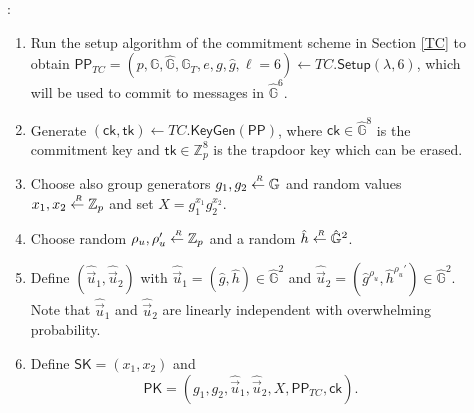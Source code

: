 \documentclass[10pt]{llncs}
\newcommand{\G}{\mathbb{G}}
\newcommand{\Z}{\mathbb{Z}}
\newcommand{\SK}{\mathsf{SK}}
\newcommand{\PK}{\mathsf{PK}}
\newcommand{\ck}{\mathsf{ck}}
\newcommand{\tk}{\mathsf{tk}}
\newcommand{\sample}{\stackrel{{\scriptscriptstyle \mkern4mu R}}{\gets}}
\newcommand{\Setup}{{\mathsf{Setup}}}
\newcommand{\KeyGen}{{\mathsf{KeyGen}}}
\newcommand{\PPP}{\mathsf{PP}}
\begin{document}
\begin{description}

\item[\boldmath{$\KeyGen(\lambda)$}]: \smallskip 
  \begin{enumerate}
  \item %
	 Run the setup algorithm of the commitment scheme in Section \ref{TC} 
	 to obtain $\PPP_{TC} = (p, \G, \hat{\G}, \G_T, e, g, \hat{g},\ell=6) 
	 \leftarrow TC.\Setup({\lambda},6) $, which will be used to commit to messages in $\hat{\G}^6$. 
  \item Generate $(\ck,\tk)\gets TC.\KeyGen(\PPP)$, where 
    ${\ck} \in \hat{\G}^8$ is the commitment key and 
    ${\tk} \in \mathbb{Z}_p^8$ is the trapdoor key which can be erased.
  \item \label{it:SPCCA-key} Choose also group generators $g_1, g_2 \sample \G$ and random values $x_1, x_2 \sample \mathbb{Z}_p$ and set $X = g_1^{x_1}g_2^{x_2}$.
  \item Choose random  $\rho_u,\rho_u' \sample \Z_p$ and a random  $\hat{h} \sample \hat{\G}^2$.
  \item Define $(\hat{\vec{u}}_1, \hat{\vec{u}}_2) $ with $\hat{\vec{u}}_1 = (\hat{g}, \hat{h}) \in \hat{\G}^2$ and $\hat{\vec{u}}_2 =  (\hat{g}^{\rho_u}, \hat{h}^{\rho_u'}) \in \hat{\G}^2$. 
    Note that $\hat{\vec{u}}_1$ and $\hat{\vec{u}}_2$ are linearly independent with overwhelming probability.
  \item \label{it:SPCCA-end} Define $\SK = (x_1, x_2)$ and $$\PK = (g_1, g_2, \hat{\vec{u}}_1, \hat{\vec{u}}_2, X, \PPP_{TC}, {\ck}).$$ 
  \end{enumerate}
  

\end{description}
\end{document}
